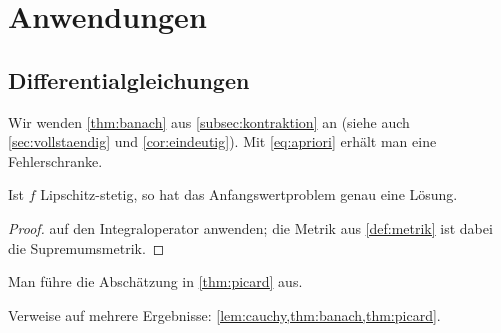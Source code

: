 \chapter{Anwendungen}
\label{chap:anwendungen}

\section{Differentialgleichungen}
\label{sec:dgl}

Wir wenden \cref{thm:banach} aus \cref{subsec:kontraktion} an
(siehe auch \cref{sec:vollstaendig} und \cref{cor:eindeutig}).
Mit \eqref{eq:apriori} erhält man eine Fehlerschranke.

\begin{theorem}
\label{thm:picard}
Ist $f$ Lipschitz-stetig, so hat das Anfangswertproblem genau eine Lösung.
\end{theorem}

\begin{proof}
 auf den Integraloperator anwenden; die Metrik aus
\cref{def:metrik} ist dabei die Supremumsmetrik.
\end{proof}

\begin{exercise}
\label{ex:picard}
Man führe die Abschätzung in \cref{thm:picard} aus.
\end{exercise}

Verweise auf mehrere Ergebnisse: \cref{lem:cauchy,thm:banach,thm:picard}.
